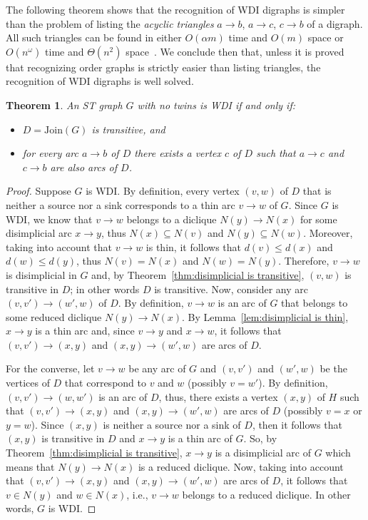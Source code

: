 \documentclass[a4paper,11pt]{article}
\newtheorem{theorem}{Theorem}
\newcommand{\JOIN}{\ensuremath{\mathrm{Join}}}
\begin{document}
The following theorem shows that the recognition of WDI digraphs is simpler than the problem of listing the \emph{acyclic triangles} $a \to b$, $a \to c$, $c \to b$ of a digraph.  All such triangles can be found in either $O(\alpha m)$ time and $O(m)$ space or $O(n^\omega)$ time and $\Theta(n^2)$ space~\cite{ChibaNishizekiSJC1985}.  We conclude then that, unless it is proved that recognizing order graphs is strictly easier than listing triangles, the recognition of WDI digraphs is well solved. 

\begin{theorem}\label{thm:WDI characterization}
  An ST graph $G$ with no twins is WDI if and only if:
  \begin{itemize}
   \item $D = \JOIN(G)$ is transitive, and 
   \item for every arc $a \to b$ of $D$ there exists a vertex $c$ of $D$ such that $a \to c$ and $c \to b$ are also arcs of $D$.   
  \end{itemize}
\end{theorem}

\begin{proof}
  Suppose $G$ is WDI.  By definition, every vertex $(v, w)$ of $D$ that is neither a source nor a sink corresponds to a thin arc $v \to w$ of $G$.  Since $G$ is WDI, we know that $v \to w$ belongs to a diclique $N(y) \to N(x)$ for some disimplicial arc $x \to y$, thus $N(x) \subseteq N(v)$ and $N(y) \subseteq N(w)$. Moreover, taking into account that $v \to w$ is thin, it follows that $d(v) \leq d(x)$ and $d(w) \leq d(y)$, thus $N(v) = N(x)$ and $N(w) = N(y)$.  Therefore, $v \to w$ is disimplicial in $G$ and, by Theorem~\ref{thm:disimplicial is transitive}, $(v,w)$ is transitive in $D$; in other words $D$ is transitive.  Now, consider any arc $(v, v') \to (w',w)$ of $D$.  By definition, $v \to w$ is an arc of $G$ that belongs to some reduced diclique $N(y) \to N(x)$.  By Lemma~\ref{lem:disimplicial is thin}, $x \to y$ is a thin arc and, since $v \to y$ and $x \to w$, it follows that $(v, v') \to (x, y)$ and $(x,y) \to (w',w)$ are arcs of $D$.  

  For the converse, let $v \to w$ be any arc of $G$ and $(v, v')$ and $(w', w)$ be the vertices of $D$ that correspond to $v$ and $w$ (possibly $v = w'$).  By definition, $(v,v') \to (w,w')$ is an arc of $D$, thus, there exists a vertex $(x, y)$ of $H$ such that $(v,v') \to (x,y)$ and $(x, y) \to (w',w)$ are arcs of $D$ (possibly $v = x$ or $y = w$).  Since $(x,y)$ is neither a source nor a sink of $D$, then it follows that $(x,y)$ is transitive in $D$ and $x \to y$ is a thin arc of $G$.  So, by Theorem~\ref{thm:disimplicial is transitive}, $x \to y$ is a disimplicial arc of $G$ which means that $N(y) \to N(x)$ is a reduced diclique.  Now, taking into account that $(v,v') \to (x,y)$ and $(x, y) \to (w',w)$ are arcs of $D$, it follows that $v \in N(y)$ and $w \in N(x)$, i.e., $v \to w$ belongs to a reduced diclique.  In other words, $G$ is WDI.
\end{proof}
\end{document}
